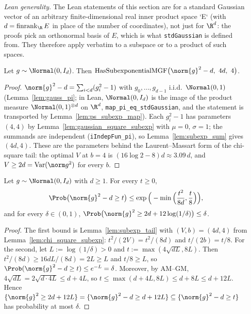 \emph{Lean generality.} The Lean statements of this section are for a standard Gaussian vector of
an arbitrary finite-dimensional real inner product space `E` (with $d = \operatorname{finrank}_{\R} E$
in place of the number of coordinates), not just for $\R^d$: the proofs pick an orthonormal basis of
$E$, which is what \texttt{stdGaussian} is defined from. They therefore apply verbatim to a subspace
or to a product of such spaces.

\begin{lemma}\label{lem:chi_square_subexp}
\leanok
{}
Let $g \sim \Normal(0, I_d)$. Then
$\mathrm{HasSubexponentialMGF}\big(\norm{g}^2 - d,\ 4d,\ 4\big)$.
\end{lemma}

\begin{proof}
\leanok
{}
$\norm{g}^2 - d = \sum_{i<d}(g_i^2 - 1)$ with $g_0,\dots,g_{d-1}$ i.i.d.\ $\Normal(0,1)$
(Lemma~\ref{lem:gauss_pi}; in Lean, $\Normal(0,I_d)$ is the image of the product measure
$\Normal(0,1)^{\otimes d}$ on $\R^d$, \texttt{map\_pi\_eq\_stdGaussian}, and the statement is
transported by Lemma~\ref{lem:ps_subexp_map}). Each $g_i^2 - 1$ has parameters $(4, 4)$ by
Lemma~\ref{lem:gaussian_square_subexp} with $\mu = 0$, $\sigma = 1$; the summands are
independent (\texttt{iIndepFun\_pi}), so Lemma~\ref{lem:subexp_sum} gives $(4d, 4)$. These are the
parameters behind the Laurent--Massart form of the chi-square tail: the optimal $V$ at $b = 4$ is
$(16\log2-8)d \approx 3.09\,d$, and $V \ge 2d = \mathrm{Var}(\norm g^2)$ for every $b$.
\end{proof}

\begin{lemma}\label{lem:chi_square_tail}
\leanok
{}
Let $g \sim \Normal(0,I_d)$ with $d \ge 1$. For every $t \ge 0$,
\[
  \Prob\big(\norm{g}^2 - d \ge t\big) \le \exp\Big(-\min\Big(\frac{t^2}{8d}, \frac{t}{8}\Big)\Big),
\]
and for every $\delta \in (0,1)$,
$\Prob\big(\norm{g}^2 \ge 2d + 12\log(1/\delta)\big) \le \delta$.
\end{lemma}

\begin{proof}
\leanok
{}
The first bound is Lemma~\ref{lem:subexp_tail} with $(V,b) = (4d,4)$ from
Lemma~\ref{lem:chi_square_subexp}: $t^2/(2V) = t^2/(8d)$ and $t/(2b) = t/8$. For the second,
let $L := \log(1/\delta) > 0$ and $t := \max(4\sqrt{dL}, 8L)$. Then $t^2/(8d) \ge 16dL/(8d) = 2L \ge L$
and $t/8 \ge L$, so $\Prob(\norm{g}^2 - d \ge t) \le e^{-L} = \delta$. Moreover, by AM--GM,
$4\sqrt{dL} = 2\sqrt{d\cdot4L} \le d + 4L$, so $t \le \max(d + 4L, 8L) \le d + 8L \le d + 12L$.
Hence $\{\norm{g}^2 \ge 2d + 12L\} = \{\norm{g}^2 - d \ge d + 12L\} \subseteq \{\norm{g}^2 - d \ge t\}$
has probability at most $\delta$.
\end{proof}

